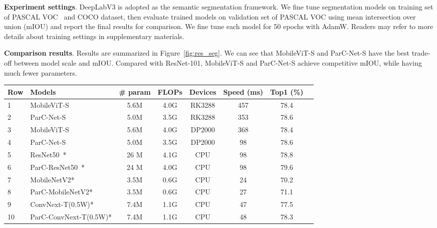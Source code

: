 \documentclass[10pt,twocolumn,letterpaper]{article}
\begin{document}
{\bf Experiment settings}. DeepLabV3 is adopted as the semantic segmentation framework. We fine tune segmentation models on training set of PASCAL VOC~\cite{2015The} and COCO dataset, then evaluate trained models on validation set of PASCAL VOC using mean intersection over union (mIOU) and report the final results for comparison. We fine tune each model for 50 epochs with AdamW. Readers may refer to more details about training settings in supplementary materials.

{\bf Comparison results}. Results are summarized in Figure~\ref{fig:res_seg}. We can see that MobileViT-S and ParC-Net-S have the best trade-off between model scale and mIOU. Compared with ResNet-101,  MobileViT-S and ParC-Net-S achieve competitive mIOU, while having much fewer parameters. 

\begin{table*}[t]
\renewcommand\arraystretch{1.1}
\begin{center}
{
\begin{tabular}{l|l|cccccl}
\hline
Row & Models  &  \# param & FLOPs & Devices & Speed (ms) & Top1 (\%)\\
\hline
1 & MobileViT-S       & 5.6M  & 4.0G & RK3288 & 457  & 78.4 \\
2 & ParC-Net-S        & 5.0M  & 3.5G & RK3288 & 353  & 78.6 \\
\hline
3 & MobileViT-S       & 5.6M  & 4.0G & DP2000 & 368 & 78.4 \\
4 & ParC-Net-S        & 5.0M  & 3.5G & DP2000 & 98  & 78.6 \\
\hline
5 & ResNet50~*        & 26 M  & 4.1G &  CPU   & 98   & 78.8  \\
6 & ParC-ResNet50~*   & 24 M  & 4.0G &  CPU   & 98   & 79.6  \\
\hline
7 & MobileNetV2*      & 3.5M  & 0.6G & CPU    & 24 & 70.2  \\
8 & ParC-MobileNetV2* & 3.5M  & 0.6G & CPU    & 27 & 71.1  \\
\hline
9 & ConvNext-T(0.5W)*        & 7.4M  & 1.1G & CPU  & 47 & 77.5  \\
10 & ParC-ConvNext-T(0.5W)*  & 7.4M  & 1.1G & CPU  & 48 & 78.3  \\
\hline
\end{tabular}
}
\end{center}
\caption{Applying ParC-Net designs on different backbones and comparing inference speeds of different models. CPU used here is Xeon E5-2680 v4. DP2000 is the code name of a in house unpublished low power neural network processor that highly optimizes the convolutions. *denotes the models are trained under convnext hyperparameters settings, which may not be the optimal. W means network width. Latency is measured with batch size 1. }
\label{Table: inference speed}
\end{table*}
\end{document}
